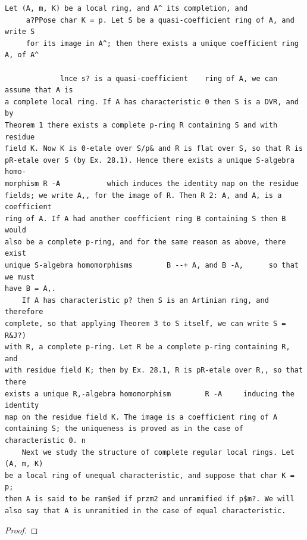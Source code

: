 \begin{theorem}\label{mcrt-auto-theorem-29-6}\uses{}
\begin{verbatim}
Let (A, m, K) be a local ring, and A^ its completion, and
     a?PPose char K = p. Let S be a quasi-coefficient ring of A, and write S
     for its image in A^; then there exists a unique coefficient ring A, of A^

             lnce s? is a quasi-coefficient    ring of A, we can assume that A is
a complete local ring. If A has characteristic 0 then S is a DVR, and by
Theorem 1 there exists a complete p-ring R containing S and with residue
field K. Now K is 0-etale over S/p& and R is flat over S, so that R is
pR-etale over S (by Ex. 28.1). Hence there exists a unique S-algebra homo-
morphism R -A           which induces the identity map on the residue
fields; we write A,, for the image of R. Then R 2: A, and A, is a coefficient
ring of A. If A had another coefficient ring B containing S then B would
also be a complete p-ring, and for the same reason as above, there exist
unique S-algebra homomorphisms        B --+ A, and B -A,      so that we must
have B = A,.
    If A has characteristic p? then S is an Artinian ring, and therefore
complete, so that applying Theorem 3 to S itself, we can write S = R&J?)
with R, a complete p-ring. Let R be a complete p-ring containing R, and
with residue field K; then by Ex. 28.1, R is pR-etale over R,, so that there
exists a unique R,-algebra homomorphism        R -A     inducing the identity
map on the residue field K. The image is a coefficient ring of A
containing S; the uniqueness is proved as in the case of characteristic 0. n
    Next we study the structure of complete regular local rings. Let (A, m, K)
be a local ring of unequal characteristic, and suppose that char K = p;
then A is said to be ram$ed if przm2 and unramified if p$m?. We will
also say that A is unramitied in the case of equal characteristic.
\end{verbatim}
\end{theorem}
\begin{proof}
\notready
\end{proof}


